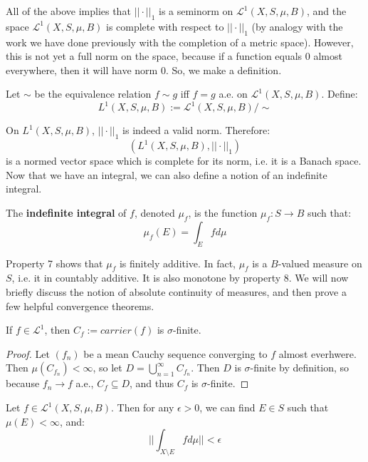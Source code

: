 	All of the above implies that $||\cdot||_1$ is a seminorm on $\mathcal L^1(X, S, \mu, B)$, and the space 
	$\mathcal L^1(X, S, \mu, B)$ is complete with respect to $||\cdot||_1$ (by analogy with the work we have done previously 
	with the completion of a metric space). However, this is not yet a full norm on the space, because if a function equals 0 
	almost everywhere, then it will have norm 0. So, we make a definition.
	
	\begin{definition}
		Let $\sim$ be the equivalence relation $f\sim g$ iff $f = g$ a.e. on $\mathcal L^1(X, S, \mu, B)$. Define:
		$$
			L^1(X, S, \mu, B) := \mathcal L^1(X, S, \mu, B) / \sim
		$$
	\end{definition}
	
	On $L^1(X, S, \mu, B)$, $||\cdot||_1$ is indeed a valid norm. Therefore:
	$$
		(L^1(X, S, \mu, B), ||\cdot||_1)
	$$
	is a normed vector space which is complete for its norm, i.e. it is a Banach space. Now that we have an integral, we 
	can also define a notion of an indefinite integral.
	
	\begin{definition}
		The \textbf{indefinite integral} of $f$, denoted $\mu_f$, is the function $\mu_f : S\rightarrow B$ such that:
		$$
			\mu_f(E) = \int_E fd\mu
		$$
	\end{definition}
	
	Property 7 shows that $\mu_f$ is finitely additive. In fact, $\mu_f$ is a $B$-valued measure on $S$, i.e. it in countably 
	additive. It is also monotone by property 8. We will now briefly discuss the notion of absolute continuity of measures, and then 
	prove a few helpful convergence theorems.
	
	\begin{prop}
		If $f\in\mathcal L^1$, then $C_f := carrier(f)$ is $\sigma$-finite. 
	\end{prop}
	
	\begin{proof}
		Let $(f_n)$ be a mean Cauchy sequence converging to $f$ almost everhwere. Then $\mu(C_{f_n}) < \infty$, so 
		let $D = \bigcup_{n = 1}^\infty C_{f_n}$. Then $D$ is $\sigma$-finite by definition, so because $f_n\rightarrow f$ 
		a.e., $C_f\subseteq D$, and thus $C_f$ is $\sigma$-finite. 
	\end{proof}
	
	\begin{prop}
		Let $f\in\mathcal L^1(X, S, \mu, B)$. Then for any $\epsilon > 0$, we can find $E\in S$ such that $\mu(E) < \infty$, 
		and:
		$$
			||\int_{X\setminus E} fd\mu|| < \epsilon
		$$
	\end{prop}
	
